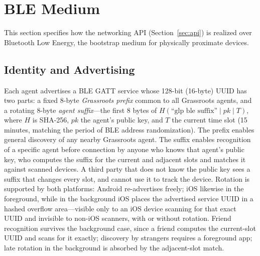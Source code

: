 \section{BLE Medium}
\label{sec:ble}
This section specifies how the networking API (Section~\ref{sec:api}) is realized over Bluetooth Low Energy, the bootstrap medium for physically proximate devices.

\subsection{Identity and Advertising}
\label{sec:ble-identity}
Each agent advertises a BLE GATT service whose 128-bit (16-byte) UUID has two parts: a fixed 8-byte \emph{Grassroots prefix} common to all Grassroots agents, and a rotating 8-byte \emph{agent suffix}---the first 8 bytes of $H(\text{``glp ble suffix''} \mid pk \mid T)$, where $H$ is SHA-256, $pk$ the agent's public key, and $T$ the current time slot (15 minutes, matching the period of BLE address randomization).  The prefix enables general discovery of any nearby Grassroots agent.  The suffix enables recognition of a specific agent before connection by anyone who knows that agent's public key, who computes the suffix for the current and adjacent slots and matches it against scanned devices.  A third party that does not know the public key sees a suffix that changes every slot, and cannot use it to track the device.  Rotation is supported by both platforms: Android re-advertises freely; iOS likewise in the foreground, while in the background iOS places the advertised service UUID in a hashed overflow area---visible only to an iOS device scanning for that exact UUID and invisible to non-iOS scanners, with or without rotation.  Friend recognition survives the background case, since a friend computes the current-slot UUID and scans for it exactly; discovery by strangers requires a foreground app; late rotation in the background is absorbed by the adjacent-slot match.

